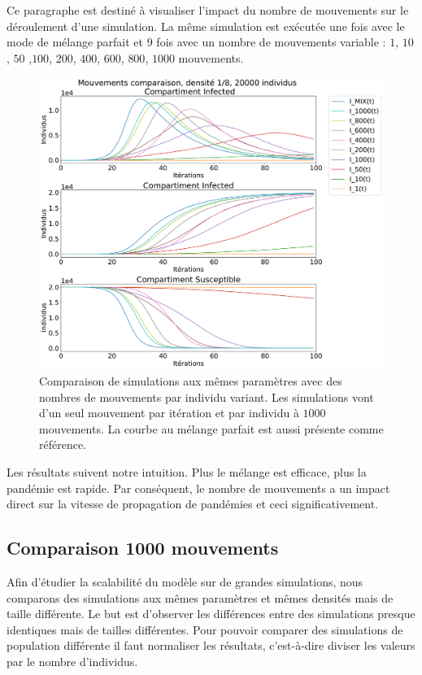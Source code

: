 Ce paragraphe est destiné à visualiser l'impact du nombre de mouvements sur le déroulement d'une simulation. La même simulation est exécutée une fois avec le mode de mélange parfait et $9$ fois avec un nombre de mouvements variable : $1$, $10$, $50$ ,$100$, $200$, $400$, $600$, $800$, $1000$ mouvements.

\begin{figure}[h]
	\centering
	\captionsetup{justification=centering}
	\includegraphics[width=.8\textwidth]{Images/SIR_mouvements_variables.pdf}
	\caption[Mouvements variable : SIR]{Comparaison de simulations aux mêmes paramètres avec des nombres de mouvements par individu variant. Les simulations vont d'un seul mouvement par itération et par individu à $1000$ mouvements. La courbe au mélange parfait est aussi présente comme référence.}
\end{figure}

Les résultats suivent notre intuition. Plus le mélange est efficace, plus la pandémie est rapide. Par conséquent, le nombre de mouvements a un impact direct sur la vitesse de propagation de pandémies et ceci significativement.

\newpage

\subsection{Comparaison 1000 mouvements}

Afin d'étudier la scalabilité du modèle sur de grandes simulations, nous comparons des simulations aux mêmes paramètres et mêmes densités mais de taille différente. Le but est d'observer les différences entre des simulations presque identiques mais de tailles différentes. Pour pouvoir comparer des simulations de population différente il faut normaliser les résultats, c'est-à-dire diviser les valeurs par le nombre d'individus.\\

